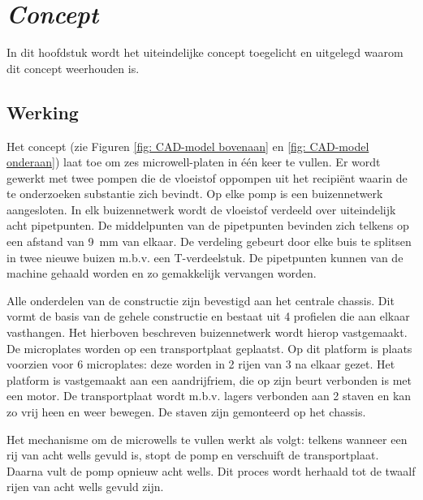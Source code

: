 \documentclass[a4paper,twoside,kulak]{kulakreport} %
\begin{document}
\chapter{\textit{Concept}} 


In dit hoofdstuk wordt het uiteindelijke concept toegelicht en uitgelegd waarom dit concept weerhouden is.

\section{Werking}

	Het concept (zie Figuren \ref{fig: CAD-model bovenaan} en \ref{fig: CAD-model onderaan}) laat toe om zes microwell-platen in één keer te vullen. Er wordt gewerkt met twee pompen die de vloeistof oppompen uit het recipiënt waarin de te onderzoeken substantie zich bevindt. Op elke pomp is een buizennetwerk aangesloten. In elk buizennetwerk wordt de vloeistof verdeeld over uiteindelijk acht pipetpunten. De middelpunten van de pipetpunten bevinden zich telkens op een afstand van \SI{9}{mm} van elkaar. De verdeling gebeurt door elke buis te splitsen in twee nieuwe buizen m.b.v. een T-verdeelstuk. De pipetpunten kunnen van de machine gehaald worden en zo gemakkelijk vervangen worden.
	
	Alle onderdelen van de constructie zijn bevestigd aan het centrale chassis. Dit vormt de basis van de gehele constructie en bestaat uit 4 profielen die aan elkaar vasthangen. Het hierboven beschreven buizennetwerk wordt hierop vastgemaakt.
	De microplates worden op een transportplaat geplaatst. Op dit platform is plaats voorzien voor 6 microplates: deze worden in 2 rijen van 3 na elkaar gezet. Het platform is vastgemaakt aan een aandrijfriem, die op zijn beurt verbonden is met een motor. De transportplaat wordt m.b.v. lagers verbonden aan 2 staven en kan zo vrij heen en weer bewegen. De staven zijn gemonteerd op het chassis.
	
	Het mechanisme om de microwells te vullen werkt als volgt: telkens wanneer een rij van acht wells gevuld is, stopt de pomp en verschuift de transportplaat. Daarna vult de pomp opnieuw acht wells. Dit proces wordt herhaald tot de twaalf rijen van acht wells gevuld zijn. 
	
\end{document}
